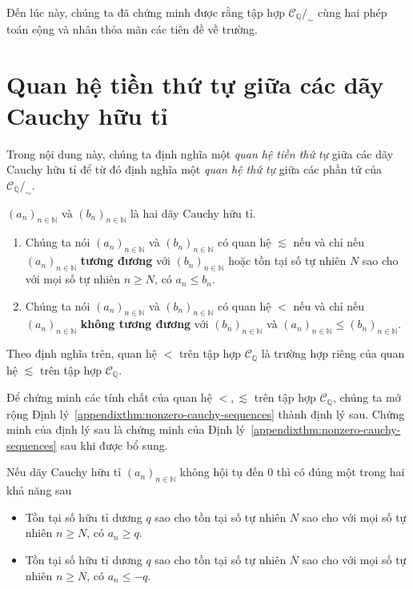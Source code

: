 Đến lúc này, chúng ta đã chứng minh được rằng tập hợp $\mathscr{C}_{\mathbb{Q}}/_{\sim}$ cùng hai phép toán cộng và nhân thỏa mãn các tiên đề về trường.

\section{Quan hệ tiền thứ tự giữa các dãy Cauchy hữu tỉ}

Trong nội dung này, chúng ta định nghĩa một \textit{quan hệ tiền thứ tự} giữa các dãy Cauchy hữu tỉ để từ đó định nghĩa một \textit{quan hệ thứ tự} giữa các phần tử của $\mathscr{C}_{\mathbb{Q}}/_{\sim}$.

\begin{definition}
    ${(a_{n})}_{n\in\mathbb{N}}$ và ${(b_{n})}_{n\in\mathbb{N}}$ là hai dãy Cauchy hữu tỉ.
    \begin{enumerate}[label={(\roman*)}]
        \item Chúng ta nói ${(a_{n})}_{n\in\mathbb{N}}$ và ${(b_{n})}_{n\in\mathbb{N}}$ có quan hệ $\lesssim$ nếu và chỉ nếu ${(a_{n})}_{n\in\mathbb{N}}$ \textbf{tương đương} với ${(b_{n})}_{n\in\mathbb{N}}$ hoặc tồn tại số tự nhiên $N$ sao cho với mọi số tự nhiên $n\geq N$, có $a_{n}\leq b_{n}$.
        \item Chúng ta nói ${(a_{n})}_{n\in\mathbb{N}}$ và ${(b_{n})}_{n\in\mathbb{N}}$ có quan hệ $<$ nếu và chỉ nếu ${(a_{n})}_{n\in\mathbb{N}}$ \textbf{không tương đương} với ${(b_{n})}_{n\in\mathbb{N}}$ và ${(a_{n})}_{n\in\mathbb{N}}\leq {(b_{n})}_{n\in\mathbb{N}}$.
    \end{enumerate}
\end{definition}

Theo định nghĩa trên, quan hệ $<$ trên tập hợp $\mathscr{C}_{\mathbb{Q}}$ là trường hợp riêng của quan hệ $\lesssim$ trên tập hợp $\mathscr{C}_{\mathbb{Q}}$.

Để chứng minh các tính chất của quan hệ $<, \lesssim$ trên tập hợp $\mathscr{C}_{\mathbb{Q}}$, chúng ta mở rộng Định lý~\ref{appendixthm:nonzero-cauchy-sequences} thành định lý sau. Chứng minh của định lý sau là chứng minh của Định lý~\ref{appendixthm:nonzero-cauchy-sequences} sau khi được bổ sung.
\begin{appendixthm}\label{appendixthm:nonzero-cauchy-sequences-and-preorder}
    Nếu dãy Cauchy hữu tỉ ${(a_{n})}_{n\in\mathbb{N}}$ không hội tụ đến $0$ thì có đúng một trong hai khả năng sau
    \begin{itemize}
        \item Tồn tại số hữu tỉ dương $q$ sao cho tồn tại số tự nhiên $N$ sao cho với mọi số tự nhiên $n\geq N$, có $a_{n}\geq q$.
        \item Tồn tại số hữu tỉ dương $q$ sao cho tồn tại số tự nhiên $N$ sao cho với mọi số tự nhiên $n\geq N$, có $a_{n}\leq -q$.
    \end{itemize}
\end{appendixthm}

